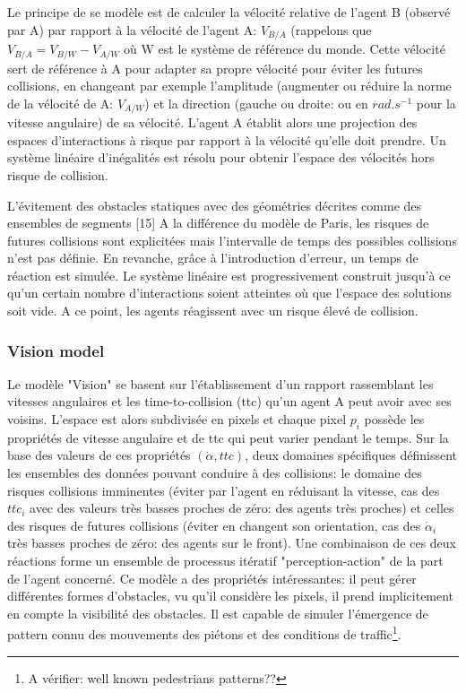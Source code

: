\documentclass[11pt]{report}
\begin{document}
Le principe de se modèle est de calculer la vélocité relative de l'agent B (observé par A)  par rapport à la vélocité de l'agent A: $V_{B/A}$ (rappelons que $V_{B/A} = V_{B/W} - V_{A/W} $ où W est le système de référence du monde. Cette vélocité sert de référence à A pour adapter sa propre vélocité pour éviter les futures collisions, en changeant par exemple l'amplitude (augmenter ou réduire la norme de la vélocité de A: $V_{A/W}$) et la direction (gauche ou droite: ou en $rad.s^{-1}$ pour la vitesse angulaire) de sa vélocité. L'agent A établit alors une projection des espaces d'interactions à risque par rapport à la vélocité qu'elle doit prendre. Un système linéaire d'inégalités est résolu pour obtenir l'espace des vélocités hors risque de collision.

L'évitement des obstacles statiques avec des géométries décrites comme des ensembles de segments [15]
A la différence du modèle de Paris, les risques de futures collisions sont explicitées mais l'intervalle de temps des possibles collisions n'est pas définie. En revanche, grâce à l'introduction d'erreur, un temps de réaction est simulée. Le système linéaire est progressivement construit jusqu'à ce qu'un certain nombre d'interactions soient atteintes où que l'espace des solutions soit vide. A ce point, les agents réagissent avec un risque élevé de collision.

\subsubsection{Vision model}

Le modèle "Vision" se basent sur l'établissement d'un rapport rassemblant les vitesses angulaires et les time-to-collision (ttc) qu'un agent A peut avoir avec ses voisins. L'espace est alors subdivisée en pixels et chaque pixel $p_i$ possède les propriétés de vitesse angulaire et de ttc qui peut varier pendant le temps. Sur la base des valeurs de ces propriétés $(\dot{\alpha}, ttc)$, deux domaines spécifiques définissent les ensembles des données pouvant conduire à des collisions: le domaine des risques collisions imminentes (éviter par l'agent en réduisant la vitesse, cas des $ttc_{i}$ avec des valeurs très basses proches de zéro: des agents très proches) et celles des risques de futures collisions (éviter en changent son orientation, cas des $\dot{\alpha}_i$ très basses proches de zéro: des agents sur le front). Une combinaison de ces deux réactions forme un ensemble de processus itératif "perception-action" de la part de l'agent concerné.
Ce modèle a des propriétés intéressantes: il peut gérer différentes formes d'obstacles, vu qu'il considère les pixels, il prend implicitement en compte la visibilité des obstacles. Il est capable de simuler l'émergence de pattern connu des mouvements des piétons et des conditions de traffic\footnote{A vérifier: well known pedestrians patterns??}.
\end{document}
